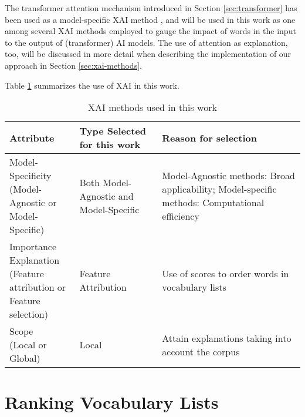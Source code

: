 The transformer attention mechanism introduced in Section \ref{sec:transformer} has been used as a model-specific XAI method
\cite{liUnderstandingNeuralNetworks2017}
\cite{leiInterpretableNeuralModels2017}
, and will be used in this work as one among several XAI methods employed to gauge the impact of words in the input to the output of (transformer) AI models.
The use of attention as explanation, too, will be discussed in more detail when describing the implementation of our approach in Section \ref{sec:xai-methods}.

Table \ref{table:XAi-method-criteria} summarizes the use of XAI in this work.

\begin{table}[ht]
	\centering
	\begin{tabularx}{\textwidth}{|X|X|X|}
		\hline
		\textbf{Attribute} & \textbf{Type Selected for this work} & \textbf{Reason for selection} \\
		\hline
		\makecell[l]{Model-Specificity                                                            \\(Model-Agnostic or \\Model-Specific)} & Both Model-Agnostic and Model-Specific & Model-Agnostic methods: Broad applicability; Model-specific methods: Computational efficiency \\
		\hline
		\makecell[l]{Importance Explanation                                                       \\(Feature attribution or \\Feature selection)}                                 & Feature Attribution                 & Use of scores to order words in vocabulary lists                                                                        \\
		\hline
		\makecell[l]{Scope                                                                        \\(Local or Global)}                                                       & Local                                  & Attain explanations taking into account the corpus                                          \\
		\hline
	\end{tabularx}
	\caption{XAI methods used in this work}
	\label{table:XAi-method-criteria}
\end{table}

\section{Ranking Vocabulary Lists} \label{sec:ranking-lists-of-vocabulary}

